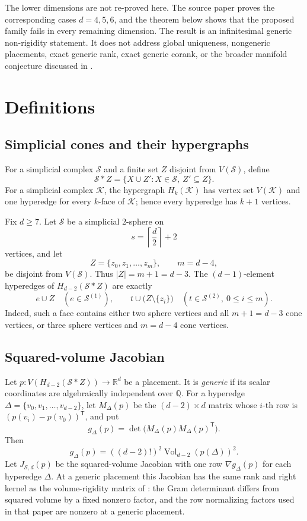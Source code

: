 \documentclass[11pt]{article}
\theoremstyle{definition}
\newcommand{\R}{\mathbb{R}}
\newcommand{\Q}{\mathbb{Q}}
\newcommand{\cS}{\mathcal{S}}
\newcommand{\Vol}{\operatorname{Vol}}
\begin{document}
The lower dimensions are not re-proved here.  The source paper proves
the corresponding cases \(d=4,5,6\), and the theorem below shows that
the proposed family fails in every remaining dimension.  The result is
an infinitesimal generic non-rigidity statement.  It does not address
global uniqueness, nongeneric placements, exact generic rank, exact
generic corank, or the broader manifold conjecture discussed in
\cite{CruickshankJacksonTanigawa2026}.

\section{Definitions}
\label{sec:definitions}

\subsection{Simplicial cones and their hypergraphs}

For a simplicial complex \(\cS\) and a finite set \(Z\) disjoint from
\(V(\cS)\), define
\[
  \cS*Z=\{X\cup Z': X\in\cS,\ Z'\subseteq Z\}.
\]
For a simplicial complex \(\mathcal K\), the hypergraph \(H_k(\mathcal
K)\) has vertex set \(V(\mathcal K)\) and one hyperedge for every
\(k\)-face of \(\mathcal K\); hence every hyperedge has \(k+1\)
vertices.

Fix \(d\geq 7\).  Let \(\cS\) be a simplicial \(2\)-sphere on
\[
  s=\left\lceil\frac d2\right\rceil+2
\]
vertices, and let
\[
  Z=\{z_0,z_1,\ldots,z_m\},
  \qquad m=d-4,
\]
be disjoint from \(V(\cS)\).  Thus \(|Z|=m+1=d-3\).  The
\((d-1)\)-element hyperedges of \(H_{d-2}(\cS*Z)\) are exactly
\begin{equation}
  e\cup Z \quad (e\in\cS^{(1)}),
  \qquad
  t\cup\bigl(Z\setminus\{z_i\}\bigr)
  \quad (t\in\cS^{(2)},\ 0\leq i\leq m).
  \label{eq:hyperedge-families}
\end{equation}
Indeed, such a face contains either two sphere vertices and all
\(m+1=d-3\) cone vertices, or three sphere vertices and \(m=d-4\) cone
vertices.

\subsection{Squared-volume Jacobian}

Let \(p:V(H_{d-2}(\cS*Z))\to\R^d\) be a placement.  It is
\emph{generic} if its scalar coordinates are algebraically independent
over \(\Q\).  For a hyperedge
\(\Delta=\{v_0,v_1,\ldots,v_{d-2}\}\), let \(M_\Delta(p)\) be the
\((d-2)\times d\) matrix whose \(i\)-th row is
\((p(v_i)-p(v_0))^{\mathsf T}\), and put
\[
  g_\Delta(p)=\det\bigl(M_\Delta(p)M_\Delta(p)^{\mathsf T}\bigr).
\]
Then
\[
  g_\Delta(p)=((d-2)!)^2\Vol_{d-2}(p(\Delta))^2.
\]
Let \(J_{\cS,d}(p)\) be the squared-volume Jacobian with one row
\(\nabla g_\Delta(p)\) for each hyperedge \(\Delta\).  At a generic
placement this Jacobian has the same rank and right kernel as the
volume-rigidity matrix of
\cite{CruickshankJacksonTanigawa2026}: the Gram determinant differs
from squared volume by a fixed nonzero factor, and the row normalizing
factors used in that paper are nonzero at a generic placement.
\end{document}
